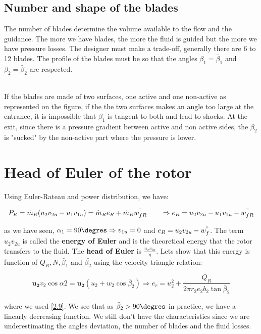 \subsection{Number and shape of the blades}
The number of blades determine the volume available to the flow and the guidance. The more we have blades, the more the fluid is guided but the more we have pressure losses. The designer must make a trade-off, generally there are 6 to 12 blades. The profile of the blades must be so that the angles $\beta _1 = \bar{\beta}_1$ and $\beta _2 = \bar{\beta}_2$ are respected. 

\ \\
If the blades are made of two surfaces, one active and one non-active as represented on the figure, if the the two surfaces makes an angle too large at the entrance, it is impossible that $\beta _1$ is tangent to both and lead to shocks. At the exit, since there is a pressure gradient between active and non active sides, the $\beta _2$ is "sucked" by the non-active part where the pressure is lower. 

\section{Head of Euler of the rotor}
Using Euler-Rateau and power distribution, we have: 

\begin{equation}
P_R =  \dot{m}_R (u_2v_{2u}-u_1v_{1u}) = \dot{m}_R e_R + \dot{m}_R w^"_{fR} \qquad \Rightarrow e_R = u_2v_{2u}-u_1v_{1u} - w^"_{fR}
\end{equation}

as we have seen, $\alpha _1 = 90\degres \Rightarrow v_{1u} = 0$ and $e_R = u_2v_{2u} - w^"_f$. The term $u_2v_{2u}$ is called the \textbf{energy of Euler} and is the theoretical energy that the rotor transfers to the fluid. The \textbf{head of Euler} is $\frac{u_2v_{2u}}{g}$. Lets show that this energy is function of $Q_R, N, \bar{\beta}_1$ and $\bar{\beta _2}$ using the velocity triangle relation: 

\begin{equation}
\bm{u_2} v_2 \cos \alpha 2 = \bm{u_2}  (u_2 + w_2 \cos \bar{\beta} _2) \Rightarrow e_r = u^2_2 + \frac{Q_R}{2\pi r_2 e_2 b_2 \tan \bar{\beta} _2}
\end{equation}

where we used \autoref{2.9}. We see that as $\bar{\beta}_2>90\degres$ in practice, we have a linearly decreasing function. We still don't have the characteristics since we are underestimating the angles deviation, the number of blades and the fluid losses. 

